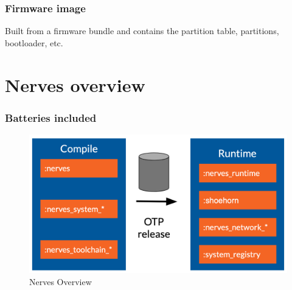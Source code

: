 \documentclass[10pt,xcolor=pdflatex,dvipsnames,table]{beamer}
\begin{document}
  \begin{frame}
    \frametitle{Firmware image}

    Built from a firmware bundle and contains the partition table, partitions,
    bootloader, etc.
  \end{frame}

	\section{Nerves overview}

  \begin{frame}
    \frametitle{Batteries included}


    \begin{figure}
      \centering
      \includegraphics[width=\textwidth]{./figures/nerves-overview}
      \caption{Nerves Overview}
    \end{figure}

  \end{frame}
\end{document}
